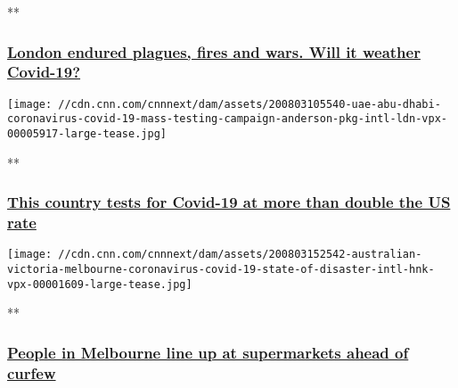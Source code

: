 **

\hypertarget{london-endured-plagues-fires-and-wars-will-it-weather-covid-19}{%
\subsubsection{\texorpdfstring{\href{/videos/world/2020/08/04/london-uk-coronavirus-covid-19-pandemic-work-from-home-black-pkg-intl-ldn-vpx.cnn/video/playlists/coronavirus-intl/}{London
endured plagues, fires and wars. Will it weather
Covid-19?}}{London endured plagues, fires and wars. Will it weather Covid-19?}}\label{london-endured-plagues-fires-and-wars-will-it-weather-covid-19}}

\href{/videos/world/2020/08/03/uae-abu-dhabi-coronavirus-covid-19-mass-testing-campaign-anderson-pkg-intl-ldn-vpx.cnn/video/playlists/coronavirus-intl/}{}

\texttt{[image: //cdn.cnn.com/cnnnext/dam/assets/200803105540-uae-abu-dhabi-coronavirus-covid-19-mass-testing-campaign-anderson-pkg-intl-ldn-vpx-00005917-large-tease.jpg]}

**

\hypertarget{this-country-tests-for-covid-19-at-more-than-double-the-us-rate}{%
\subsubsection{\texorpdfstring{\href{/videos/world/2020/08/03/uae-abu-dhabi-coronavirus-covid-19-mass-testing-campaign-anderson-pkg-intl-ldn-vpx.cnn/video/playlists/coronavirus-intl/}{This
country tests for Covid-19 at more than double the US
rate}}{This country tests for Covid-19 at more than double the US rate}}\label{this-country-tests-for-covid-19-at-more-than-double-the-us-rate}}

\href{/videos/world/2020/08/03/australian-victoria-melbourne-coronavirus-covid-19-state-of-disaster-intl-hnk-vpx.cnn/video/playlists/coronavirus-intl/}{}

\texttt{[image: //cdn.cnn.com/cnnnext/dam/assets/200803152542-australian-victoria-melbourne-coronavirus-covid-19-state-of-disaster-intl-hnk-vpx-00001609-large-tease.jpg]}

**

\hypertarget{people-in-melbourne-line-up-at-supermarkets-ahead-of-curfew}{%
\subsubsection{\texorpdfstring{\href{/videos/world/2020/08/03/australian-victoria-melbourne-coronavirus-covid-19-state-of-disaster-intl-hnk-vpx.cnn/video/playlists/coronavirus-intl/}{People
in Melbourne line up at supermarkets ahead of
curfew}}{People in Melbourne line up at supermarkets ahead of curfew}}\label{people-in-melbourne-line-up-at-supermarkets-ahead-of-curfew}}

